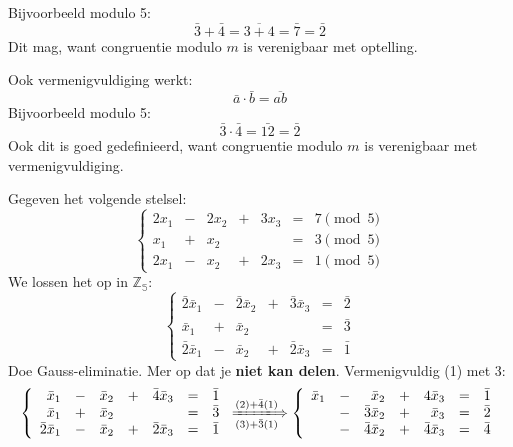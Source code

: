 Bijvoorbeeld modulo 5:
\begin{equation*}
    \bar{3} + \bar{4} = \overline{3+4} = \bar{7} = \bar{2}
\end{equation*}
Dit mag, want congruentie modulo $m$ is verenigbaar met optelling.

Ook vermenigvuldiging werkt:
\begin{equation*}
    \bar{a} \cdot \bar{b} = \overline{ab}
\end{equation*}
Bijvoorbeeld modulo 5:
\begin{equation*}
    \bar{3} \cdot \bar{4} = \bar{12} = \bar{2}
\end{equation*}
Ook dit is goed gedefinieerd, want congruentie modulo $m$ is verenigbaar met vermenigvuldiging.

\textbf{} Gegeven het volgende stelsel:
\begin{equation*}
\left\{
\begin{array}{rcrcrcl}
    2x_1 & - & 2x_2 & + & 3x_3 & = & 7 \pmod{5} \\
     x_1 & + &  x_2 &   &      & = & 3 \pmod{5} \\
    2x_1 & - &  x_2 & + & 2x_3 & = & 1 \pmod{5}
\end{array}
\right.
\end{equation*}
We lossen het op in $\mathbb{Z_5}$:
\begin{equation*}
\left\{
\begin{array}{rcrcrcl}
    \bar{2}\bar{x}_1 & - & \bar{2}\bar{x}_2 & + & \bar{3}\bar{x}_3 & = & \bar{2} \\
     \bar{x}_1 & + &  \bar{x}_2 &   &            & = & \bar{3} \\
    \bar{2}\bar{x}_1 & - &  \bar{x}_2 & + & \bar{2}\bar{x}_3 & = & \bar{1}
\end{array}
\right.
\end{equation*}
Doe Gauss-eliminatie. Mer op dat je \textbf{niet kan delen}. Vermenigvuldig (1) met 3:
\begin{equation*}
\left\{
\begin{array}{rcrcrcl}
     \bar{x}_1 & - &  \bar{x}_2 & +  & \bar{4}\bar{x}_3 & = & \bar{1} \\
     \bar{x}_1 & + &  \bar{x}_2 &    &            & = & \bar{3} \\
    \bar{2}\bar{x}_1 & - &  \bar{x}_2 & +  & \bar{2}\bar{x}_3 & = & \bar{1}
\end{array}
\right.
\xLongrightarrow[(3) + \bar{3}(1)]{(2) + \bar{4}(1)}
\left\{
\begin{array}{rcrcrcl}
     \bar{x}_1 & - & \bar{x}_2 & + & 4\bar{x}_3 & = & \bar{1} \\
               & - & \bar{3}\bar{x}_2 & + & \bar{x}_3 & = & \bar{2} \\
               & - & \bar{4}\bar{x}_2 & + & \bar{4}\bar{x}_3 & = & \bar{4}
\end{array}
\right.
\end{equation*}

